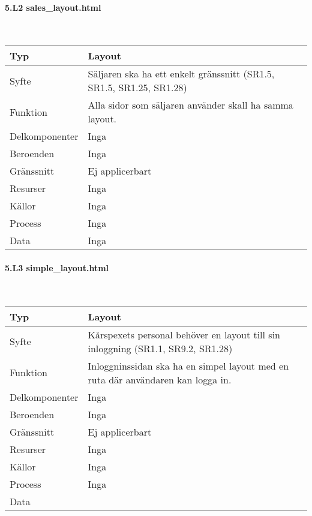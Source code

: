 \documentclass[a4paper, twoside, 11pt, titlepage]{article}
\begin{document}
			\paragraph{5.L2 sales\_layout.html}\

			\begin {table} [ht] \begin{tabular} {  p{3.5cm} p{9.6cm} }
				\hline
				{Typ} & {Layout} \\
				\hline
				{Syfte} & {Säljaren ska ha ett enkelt gränssnitt (SR1.5, SR1.5, SR1.25, SR1.28)} \\
				\hline
				{Funktion} & {Alla sidor som säljaren använder skall ha samma layout.} \\
				\hline
				{Delkomponenter} & {Inga} \\
				\hline
				{Beroenden} & {Inga} \\
				\hline
				{Gränssnitt} & {Ej applicerbart} \\
				\hline
				{Resurser} & {Inga} \\
				\hline
				{Källor} & {Inga} \\
				\hline
				{Process} & {Inga} \\
				\hline
				{Data} & {Inga} \\
				\hline
			\end{tabular} \end{table} \FloatBarrier


			\paragraph{5.L3 simple\_layout.html}\

			\begin {table} [ht] \begin{tabular} {  p{3.5cm} p{9.6cm} }
				\hline
				{Typ} & {Layout} \\
				\hline
				{Syfte} & {Kårspexets personal behöver en layout till sin inloggning (SR1.1, SR9.2, SR1.28)} \\
				\hline
				{Funktion} & {Inloggninssidan ska ha en simpel layout med en ruta där användaren kan logga in.} \\
				\hline
				{Delkomponenter} & {Inga} \\
				\hline
				{Beroenden} & {Inga} \\
				\hline
				{Gränssnitt} & {Ej applicerbart} \\
				\hline
				{Resurser} & {Inga} \\
				\hline
				{Källor} & {Inga} \\
				\hline
				{Process} & {Inga} \\
				\hline
				{Data} & { } \\
				\hline
			\end{tabular} \end{table} \FloatBarrier
\end{document}
